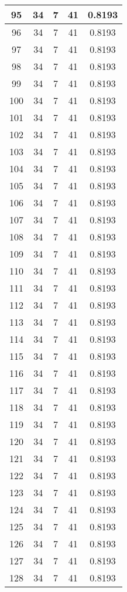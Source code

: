\documentclass[letterpaper, 12pt]{article}
\begin{document}
\begin{longtable}{|c|c|c|c|c|}
\hline
95 & 34 & 7 & 41 & 0.8193 \\
\hline
96 & 34 & 7 & 41 & 0.8193 \\
\hline
97 & 34 & 7 & 41 & 0.8193 \\
\hline
98 & 34 & 7 & 41 & 0.8193 \\
\hline
99 & 34 & 7 & 41 & 0.8193 \\
\hline
100 & 34 & 7 & 41 & 0.8193 \\
\hline
101 & 34 & 7 & 41 & 0.8193 \\
\hline
102 & 34 & 7 & 41 & 0.8193 \\
\hline
103 & 34 & 7 & 41 & 0.8193 \\
\hline
104 & 34 & 7 & 41 & 0.8193 \\
\hline
105 & 34 & 7 & 41 & 0.8193 \\
\hline
106 & 34 & 7 & 41 & 0.8193 \\
\hline
107 & 34 & 7 & 41 & 0.8193 \\
\hline
108 & 34 & 7 & 41 & 0.8193 \\
\hline
109 & 34 & 7 & 41 & 0.8193 \\
\hline
110 & 34 & 7 & 41 & 0.8193 \\
\hline
111 & 34 & 7 & 41 & 0.8193 \\
\hline
112 & 34 & 7 & 41 & 0.8193 \\
\hline
113 & 34 & 7 & 41 & 0.8193 \\
\hline
114 & 34 & 7 & 41 & 0.8193 \\
\hline
115 & 34 & 7 & 41 & 0.8193 \\
\hline
116 & 34 & 7 & 41 & 0.8193 \\
\hline
117 & 34 & 7 & 41 & 0.8193 \\
\hline
118 & 34 & 7 & 41 & 0.8193 \\
\hline
119 & 34 & 7 & 41 & 0.8193 \\
\hline
120 & 34 & 7 & 41 & 0.8193 \\
\hline
121 & 34 & 7 & 41 & 0.8193 \\
\hline
122 & 34 & 7 & 41 & 0.8193 \\
\hline
123 & 34 & 7 & 41 & 0.8193 \\
\hline
124 & 34 & 7 & 41 & 0.8193 \\
\hline
125 & 34 & 7 & 41 & 0.8193 \\
\hline
126 & 34 & 7 & 41 & 0.8193 \\
\hline
127 & 34 & 7 & 41 & 0.8193 \\
\hline
128 & 34 & 7 & 41 & 0.8193 \\

\end{longtable}
\end{document}
